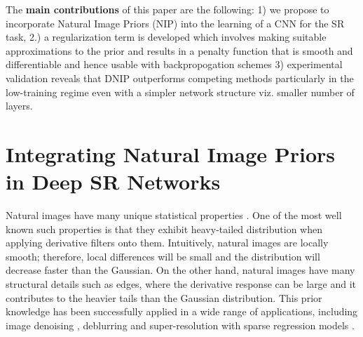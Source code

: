 \documentclass[9pt]{article}
\begin{document}
The \textbf{main contributions} of this paper are the following: 1)  we propose to incorporate Natural Image Priors (NIP) \cite{kim2010single,tappen2003exploiting} into the learning of a CNN for the SR task,  2.) a regularization term is developed which involves making suitable approximations to the prior and results in a penalty function that is smooth and differentiable and hence usable with backpropogation schemes 3) experimental validation reveals that DNIP outperforms competing methods particularly in the low-training regime even with a simpler network structure viz. smaller number of layers.





\vspace{-5mm}
\section{Integrating Natural Image Priors in Deep SR Networks}
\label{sec:img_priors}


Natural images have many unique statistical properties \cite{zontak2011internal, weiss2007makes}.
One of the most well known such properties is that they exhibit heavy-tailed
distribution when applying derivative filters onto them.
Intuitively, natural images are locally smooth; therefore, local differences
will be small and  the distribution will decrease
faster than the Gaussian.
On the other hand,
natural images have many structural details such as edges, where
the derivative response can be large and it contributes to the
heavier tails than the Gaussian distribution.
This prior knowledge has been successfully applied in a wide range of applications, including image denoising \cite{weiss2007makes}, deblurring \cite{field1987relations} and super-resolution with sparse regression models \cite{kim2010single}.
\end{document}

